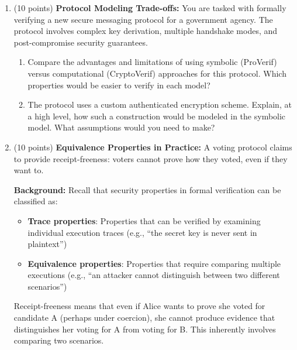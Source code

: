 \documentclass[10pt,a4paper,american]{article}
\begin{document}
\begin{enumerate}
	\item (10 points) \textbf{Protocol Modeling Trade-offs:}
	      You are tasked with formally verifying a new secure messaging protocol for a government agency. The protocol involves complex key derivation, multiple handshake modes, and post-compromise security guarantees.
	      \begin{enumerate}
		      \item Compare the advantages and limitations of using symbolic (ProVerif) versus computational (CryptoVerif) approaches for this protocol. Which properties would be easier to verify in each model?
		      \item The protocol uses a custom authenticated encryption scheme. Explain, at a high level, how such a construction would be modeled in the symbolic model. What assumptions would you need to make?
	      \end{enumerate}
	\item (10 points) \textbf{Equivalence Properties in Practice:}
	      A voting protocol claims to provide receipt-freeness: voters cannot prove how they voted, even if they want to.

	      \textbf{Background:} Recall that security properties in formal verification can be classified as:
	      \begin{itemize}
		      \item \textbf{Trace properties}: Properties that can be verified by examining individual execution traces (e.g., ``the secret key is never sent in plaintext'')
		      \item \textbf{Equivalence properties}: Properties that require comparing multiple executions (e.g., ``an attacker cannot distinguish between two different scenarios'')
	      \end{itemize}

	      Receipt-freeness means that even if Alice wants to prove she voted for candidate A (perhaps under coercion), she cannot produce evidence that distinguishes her voting for A from voting for B. This inherently involves comparing two scenarios.


\end{enumerate}
\end{document}
